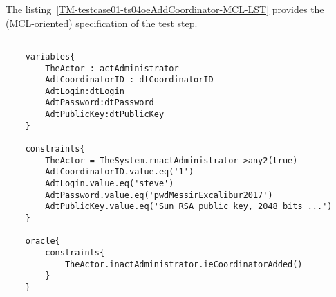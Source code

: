 	
	
		
	\vspace{1cm}
	The listing~\ref{TM-testcase01-ts04oeAddCoordinator-MCL-LST} provides the \msrmessir (MCL-oriented) specification of the test step.
	
	\scriptsize
	\vspace{0.5cm}
	\begin{lstlisting}[style=MessirStyle,firstnumber=auto,captionpos=b,caption={\msrmessir (MCL-oriented) specification of the test step \emph{testcase01-ts04oeAddCoordinator}.},label=TM-testcase01-ts04oeAddCoordinator-MCL-LST]

	variables{
		TheActor : actAdministrator
		AdtCoordinatorID : dtCoordinatorID
		AdtLogin:dtLogin
		AdtPassword:dtPassword
		AdtPublicKey:dtPublicKey
	}
	
	constraints{
		TheActor = TheSystem.rnactAdministrator->any2(true)
		AdtCoordinatorID.value.eq('1')
		AdtLogin.value.eq('steve')
		AdtPassword.value.eq('pwdMessirExcalibur2017')
		AdtPublicKey.value.eq('Sun RSA public key, 2048 bits ...')
	}
	
	oracle{
		constraints{
			TheActor.inactAdministrator.ieCoordinatorAdded()
		}
	}
	
	\end{lstlisting}
	\normalsize 
	
	
